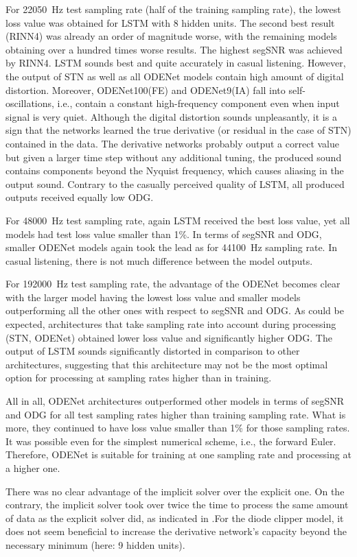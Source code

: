 For \SI{22050}{Hz} test sampling rate (half of the training sampling rate), the lowest loss value was obtained for \ac{LSTM} with 8 hidden units. The second best result (\ac{RINN}4) was already an order of magnitude worse, with the remaining models obtaining over a hundred times worse results. The highest \ac{segSNR} was achieved by \ac{RINN}4. \ac{LSTM} sounds best and quite accurately in casual listening. However, the output of \ac{STN} as well as all ODENet models contain high amount of digital distortion. Moreover, ODENet100(FE) and ODENet9(IA) fall into self-oscillations, i.e., contain a constant high-frequency component even when input signal is very quiet. Although the digital distortion sounds unpleasantly, it is a sign that the networks learned the true derivative (or residual in the case of \ac{STN}) contained in the data. The derivative networks probably output a correct value but given a larger time step without any additional tuning, the produced sound contains components beyond the Nyquist frequency, which causes aliasing in the output sound. Contrary to the casually perceived quality of \ac{LSTM}, all produced outputs received equally low \ac{ODG}. 

For \SI{48000}{Hz} test sampling rate, again \ac{LSTM} received the best loss value, yet all models had test loss value smaller than 1\%. In terms of \ac{segSNR} and \ac{ODG}, smaller ODENet models again took the lead as for \SI{44100}{Hz} sampling rate. In casual listening, there is not much difference between the model outputs.

For \SI{192000}{Hz} test sampling rate, the advantage of the ODENet becomes clear with the larger model having the lowest loss value and smaller models outperforming all the other ones with respect to \ac{segSNR} and \ac{ODG}. As could be expected, architectures that take sampling rate into account during processing (\ac{STN}, ODENet) obtained lower loss value and significantly higher \ac{ODG}. The output of \ac{LSTM} sounds significantly distorted in comparison to other architectures, suggesting that this architecture may not be the most optimal option for processing at sampling rates higher than in training. 

All in all, ODENet architectures outperformed other models in terms of \ac{segSNR} and \ac{ODG} for all test sampling rates higher than training sampling rate. What is more, they continued to have loss value smaller than 1\% for those sampling rates. It was possible even for the simplest numerical scheme, i.e., the forward Euler. Therefore, ODENet is suitable for training at one sampling rate and processing at a higher one.

There was no clear advantage of the implicit solver over the explicit one. On the contrary, the implicit solver took over twice the time to process the same amount of data as the explicit solver did, as indicated in .For the diode clipper model, it does not seem beneficial to increase the derivative network's capacity beyond the necessary minimum (here: 9 hidden units). 
